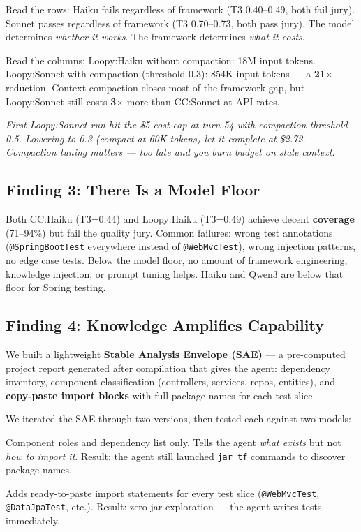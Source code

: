 \documentclass[11pt,a4paper]{article}
\begin{document}
Read the rows: Haiku fails regardless of framework (T3 0.40--0.49, both fail jury).
Sonnet passes regardless of framework (T3 0.70--0.73, both pass jury).
The model determines \emph{whether it works}. The framework determines \emph{what it costs}.

Read the columns: Loopy:Haiku without compaction: 18M input tokens.
Loopy:Sonnet with compaction (threshold 0.3): 854K input tokens ---
a \textbf{21$\times$} reduction. Context compaction closes most of the framework gap,
but Loopy:Sonnet still costs \textbf{3$\times$} more than CC:Sonnet at API rates.

\textit{First Loopy:Sonnet run hit the \$5 cost cap at turn 54 with compaction
threshold 0.5. Lowering to 0.3 (compact at 60K tokens) let it complete at \$2.72.
Compaction tuning matters --- too late and you burn budget on stale context.}

\subsection{Finding 3: There Is a Model Floor}

Both CC:Haiku (T3=0.44) and Loopy:Haiku (T3=0.49) achieve decent
\textbf{coverage} (71--94\%) but fail the quality jury. Common failures:
wrong test annotations (\texttt{@SpringBootTest} everywhere instead of
\texttt{@WebMvcTest}), wrong injection patterns, no edge case tests.
Below the model floor, no amount of framework engineering, knowledge injection,
or prompt tuning helps. Haiku and Qwen3 are below that floor for Spring testing.

\subsection{Finding 4: Knowledge Amplifies Capability}

We built a lightweight \textbf{Stable Analysis Envelope (SAE)} --- a pre-computed
project report generated after compilation that gives the agent: dependency inventory,
component classification (controllers, services, repos, entities), and
\textbf{copy-paste import blocks} with full package names for each test slice.

We iterated the SAE through two versions, then tested each against two models:

\begin{description}[style=nextline, leftmargin=2em]
  \item[SAE v1 (short annotations)]
    Component roles and dependency list only. Tells the agent \emph{what exists}
    but not \emph{how to import it}. Result: the agent still launched
    \texttt{jar tf} commands to discover package names.
  \item[SAE v2 (full import blocks)]
    Adds ready-to-paste import statements for every test slice
    (\texttt{@WebMvcTest}, \texttt{@DataJpaTest}, etc.).
    Result: zero jar exploration --- the agent writes tests immediately.
\end{description}
\end{document}
